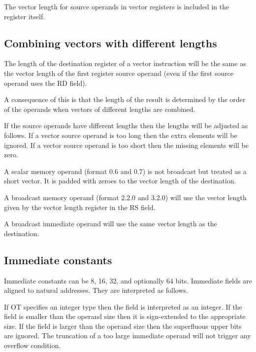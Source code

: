\documentclass[forwardcom.tex]{subfiles}
\begin{document}
The vector length for source operands in vector registers is included in the register itself.

\subsection{Combining vectors with different lengths}
The length of the destination register of a vector instruction will be the same as the vector length of the first register source operand (even if the first source operand uses the RD field).
\vspace{2mm}

A consequence of this is that the length of the result is determined by the order of the operands when vectors of different lengths are combined.
\vspace{2mm}

If the source operands have different lengths then the lengths will be adjusted as follows. If a vector source operand is too long then the extra elements will be ignored. If a vector source operand is too short then the missing elements will be zero.
\vspace{2mm}

A scalar memory operand (format 0.6 and 0.7) is not broadcast but treated as a short vector. It is padded with zeroes to the vector length of the destination.
\vspace{2mm}

A broadcast memory operand (format 2.2.0 and 3.2.0) will use the vector length given by the vector length register in the RS field.
\vspace{2mm}

A broadcast immediate operand will use the same vector length as the destination.

\subsection{Immediate constants}
Immediate constants can be 8, 16, 32, and optionally 64 bits. Immediate fields are aligned to natural addresses. They are interpreted as follows.
\vspace{2mm}

If OT specifies an integer type then the field is interpreted as an integer. If the field is smaller than the operand size then it is sign-extended to the appropriate size. If the field is larger than the operand size then the superfluous upper bits are ignored. The truncation of a too large immediate operand will not trigger any overflow condition.
\vspace{2mm}
\end{document}
